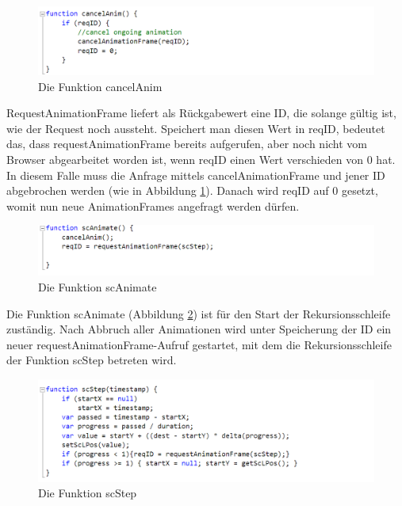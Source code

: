 \begin{figure} [h]
\includegraphics[width=\textwidth]{./img/js_cancelanim.png}
\caption{Die Funktion cancelAnim}
\label{js_cancelanim}
\end{figure}

RequestAnimationFrame liefert als Rückgabewert eine ID, die solange gültig ist, wie der Request noch aussteht. Speichert man diesen Wert in reqID, bedeutet das, dass requestAnimationFrame bereits aufgerufen, aber noch nicht vom Browser abgearbeitet worden ist, wenn reqID einen Wert verschieden von 0 hat. In diesem Falle muss die Anfrage mittels cancelAnimationFrame und jener ID abgebrochen werden (wie in Abbildung \ref{js_cancelanim}). Danach wird reqID auf 0 gesetzt, womit nun neue AnimationFrames angefragt werden dürfen.

\begin{figure} [h]
\includegraphics[width=\textwidth]{./img/js_scanim.png}
\caption{Die Funktion scAnimate}
\label{js_scanim}
\end{figure}

Die Funktion scAnimate (Abbildung \ref{js_scanim}) ist für den Start der Rekursionsschleife zuständig. Nach Abbruch aller Animationen wird unter Speicherung der ID ein neuer requestAnimationFrame-Aufruf gestartet, mit dem die Rekursionsschleife der Funktion scStep betreten wird.

\begin{figure} [h]
\includegraphics[width=\textwidth]{./img/js_scstep.png}
\caption{Die Funktion scStep}
\label{js_scstep}
\end{figure}

